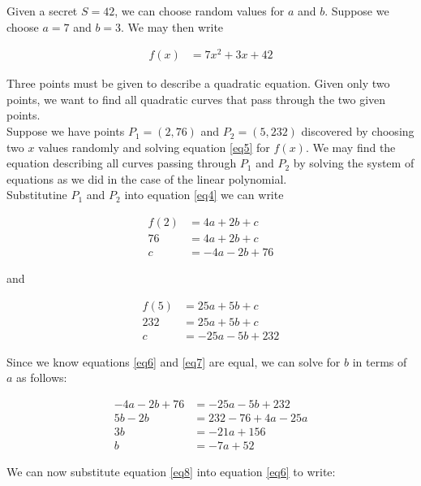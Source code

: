 \documentclass[preview,border=3mm]{article}
\begin{document}
\noindent
Given a secret $S = 42$, we can choose random values for $a$ and $b$. Suppose
we choose $a = 7$ and $b = 3$. We may then write

\begin{align}
    f(x) &= 7x^2 + 3x + 42 \label{eq5}
\end{align}

\noindent
Three points must be given to describe a quadratic equation. Given only two
points, we want to find all quadratic curves that pass through the two given
points.\\

\noindent
Suppose we have points $P_1 = (2, 76)$ and $P_2 = (5, 232)$ discovered by choosing
two $x$ values randomly and solving equation \ref{eq5} for $f(x)$. We may find
the equation describing all curves passing through $P_1$ and $P_2$ by solving
the system of equations as we did in the case of the linear polynomial.\\

\noindent
Substitutine $P_1$ and $P_2$ into equation \ref{eq4} we can write

\begin{align}
    f(2) &= 4a + 2b + c \nonumber \\
    76   &= 4a + 2b + c \nonumber \\
    c    &= -4a - 2b + 76 \label{eq6}
\end{align}

\noindent
and

\begin{align}
    f(5) &= 25a + 5b + c \nonumber \\
    232  &= 25a + 5b + c \nonumber \\
    c    &= -25a - 5b + 232 \label{eq7}
\end{align}

\noindent
Since we know equations \ref{eq6} and \ref{eq7} are equal, we can solve for $b$
in terms of $a$ as follows:

\begin{align}
    -4a - 2b + 76 &= -25a - 5b + 232 \nonumber \\
    5b - 2b       &= 232 - 76 + 4a - 25a \nonumber \\
    3b            &= -21a + 156 \nonumber\\
    b             &= -7a + 52 \label{eq8}
\end{align}

\noindent
We can now substitute equation \ref{eq8} into equation \ref{eq6} to write:
\end{document}
